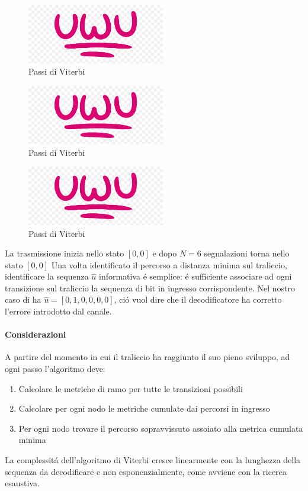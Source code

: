             \begin{figure}[H]
                \centering
                \includegraphics[width = 6cm]{media/uwu.png}
                \caption{Passi di Viterbi}
            \end{figure}
            \begin{figure}[H]
                \centering
                \includegraphics[width = 6cm]{media/uwu.png}
                \caption{Passi di Viterbi}
            \end{figure}
            \begin{figure}[H]
                \centering
                \includegraphics[width = 6cm]{media/uwu.png}
                \caption{Passi di Viterbi}
            \end{figure}
            La trasmissione inizia nello stato $[0,0]$ e dopo $N = 6$ segnalazioni torna nello stato $[0,0]$
            Una volta identificato il percorso a distanza minima sul traliccio, identificare la sequenza $\hat{u}$
            informativa é semplice: é sufficiente associare ad ogni transizione sul traliccio la sequenza di bit in ingresso corrispondente.
            Nel nostro caso di ha $\hat{u} = [0,1,0,0,0,0]$, ció vuol dire che il decodificatore ha corretto l'errore introdotto dal canale.
            \paragraph{Considerazioni}
                A partire del momento in cui il traliccio ha raggiunto il suo pieno sviluppo, ad ogni passo l'algoritmo deve:
                \begin{enumerate}
                    \item {Calcolare le metriche di ramo per tutte le transizioni possibili}
                    \item {Calcolare per ogni nodo le metriche cumulate dai percorsi in ingresso}
                    \item {Per ogni nodo trovare il percorso sopravvissuto assoiato alla metrica cumulata minima}
                \end{enumerate}
                La complessitá dell'algoritmo di Viterbi cresce linearmente con la lunghezza della sequenza da 
                decodificare e non esponenzialmente, come avviene con la ricerca esaustiva.

